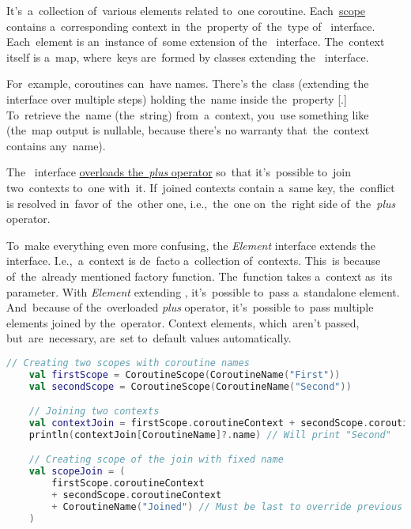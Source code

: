 \label{kotlincoroutinecontext}
It's~a~collection of~various elements related to~one coroutine.
Each~\hyperref[kotlincoroutinescope]{scope} contains a~corresponding context in~the~property  of~the~type of~ interface.
Each~element is an~instance of~some extension of the~ interface.
The~context itself is a~map, where~keys are~formed by classes extending the~ interface.

For~example, coroutines can~have names.
There's the~class  (extending the~ interface over multiple steps) holding the~name inside the~property [.]
To~retrieve the~name (the~string) from~a~context, you~use something like  (the~map output is nullable, because there's no warranty that~the~context contains any~name).

The~ interface \hyperref[kotlinoperatoroverload]{overloads the~\textit{plus} operator} so~that it's~possible to~join two~contexts to~one with~it.
If~joined contexts contain a~same key, the~conflict is resolved in~favor of~the~other one, i.e.,~the~one on~the~right side of~the~\textit{plus} operator.

To~make everything even more confusing, the \textit{Element} interface extends the~ interface.
I.e.,~a~context is de~facto a~collection of~contexts.
This~is because of~the~already mentioned \hyperref[kotlincoroutinescope]{} factory function.
The~function takes a~context as~its parameter.
With \textit{Element} extending , it's~possible to~pass a~standalone element.
And~because of the~overloaded \textit{plus} operator, it's~possible to~pass multiple elements joined by the~operator.
Context elements, which~aren't passed, but~are~necessary, are~set to~default values automatically.

\begin{lstlisting}[language=Kotlin]
    // Creating two scopes with coroutine names
    val firstScope = CoroutineScope(CoroutineName("First"))
    val secondScope = CoroutineScope(CoroutineName("Second"))

    // Joining two contexts
    val contextJoin = firstScope.coroutineContext + secondScope.coroutineContext
    println(contextJoin[CoroutineName]?.name) // Will print "Second"

    // Creating scope of the join with fixed name
    val scopeJoin = (
        firstScope.coroutineContext
        + secondScope.coroutineContext
        + CoroutineName("Joined") // Must be last to override previous
    )
\end{lstlisting}
\newpage
